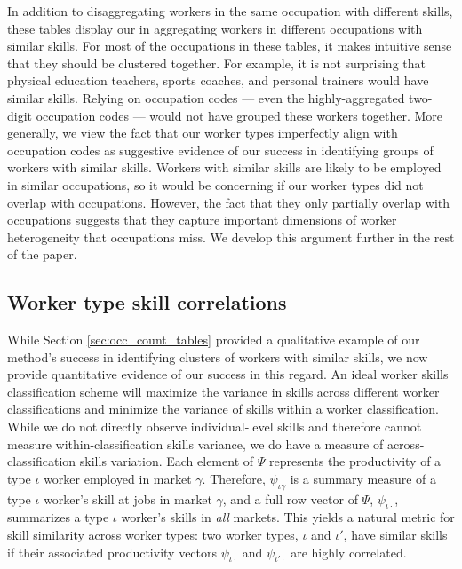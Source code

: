 \documentclass[12pt]{article}
\def\ig{\iota\gamma}
\def\g{\gamma}
\def\i{\iota}
\theoremstyle{definition}
\theoremstyle{plain}
\begin{document}
In addition to disaggregating workers in the same occupation with different skills, these tables display our  in aggregating workers in different occupations with similar skills. For most of the occupations in these tables, it makes intuitive sense that they should be clustered together. For example, it is not surprising that physical education teachers, sports coaches, and personal trainers would have similar skills.  Relying on occupation codes --- even the highly-aggregated two-digit occupation codes --- would not have grouped these workers together. More generally, we view the fact that our worker types imperfectly align with occupation codes as suggestive evidence of our success in identifying groups of workers with similar skills. Workers with similar skills are likely to be employed in similar occupations, so it would be concerning if our worker types did not overlap with occupations. However, the fact that they only partially overlap with occupations suggests that they capture important dimensions of worker heterogeneity that occupations miss. We develop this argument further in the rest of the paper. 










\subsection{Worker type skill correlations}

\label{sec:correlograms}

While Section \ref{sec:occ_count_tables} provided a qualitative example of our method's success in identifying clusters of workers with similar skills, we now provide quantitative evidence of our success in this regard. An ideal worker skills classification scheme will maximize the variance in skills across different worker classifications and minimize the variance of skills within a worker classification. While we do not directly observe individual-level skills and therefore cannot measure within-classification skills variance, we do have a measure of across-classification skills variation. Each element of $\Psi$ represents the productivity of a type $\i$ worker employed in market $\g$. Therefore, $\psi_{\ig}$ is a summary measure of a type $\i$ worker's skill at jobs in market $\g$, and a full row vector of $\Psi$, $\psi_{\i\cdot}$, summarizes a type $\i$ worker's skills in \emph{all} markets. This yields a natural metric for skill similarity across worker types: two worker types, $\i$ and $\i'$, have similar skills if their associated productivity vectors $\psi_{\i\cdot}$ and $\psi_{\i'\cdot}$ are highly correlated.
\end{document}
